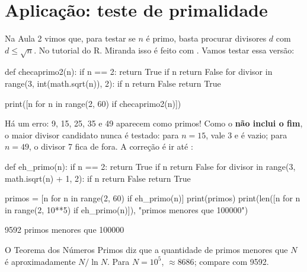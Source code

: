 \section{Aplicação: teste de primalidade}

Na Aula 2 vimos que, para testar se $n$ é primo, basta procurar divisores $d$ com $d\le\sqrt n$. No tutorial do
R. Miranda isso é feito com . Vamos testar essa versão:

\begin{entrada}
def checaprimo2(n):
    if n == 2:
        return True
    if n %
        return False
    for divisor in range(3, int(math.sqrt(n)), 2):
        if n %
            return False
    return True

print([n for n in range(2, 60) if checaprimo2(n)])
\end{entrada}
\begin{saida}
[2, 3, 5, 7, 9, 11, 13, 15, 17, 19, 23, 25, 29, 31, 35, 37, 41, 43, 47, 49, 53, 59]
\end{saida}

Há um erro: 9, 15, 25, 35 e 49 aparecem como primos! Como o  \textbf{não inclui o fim}, o maior
divisor candidato nunca é testado: para $n=15$,  vale 3 e  é vazio;
para $n=49$, o divisor 7 fica de fora. A correção é ir até :

\begin{entrada}
def eh_primo(n):
    if n == 2:
        return True
    if n %
        return False
    for divisor in range(3, math.isqrt(n) + 1, 2):
        if n %
            return False
    return True

primos = [n for n in range(2, 60) if eh_primo(n)]
print(primos)
print(len([n for n in range(2, 10**5) if eh_primo(n)]), "primos menores que 100000")
\end{entrada}
\begin{saida}
[2, 3, 5, 7, 11, 13, 17, 19, 23, 29, 31, 37, 41, 43, 47, 53, 59]
9592 primos menores que 100000
\end{saida}

\begin{observacao}
O Teorema dos Números Primos diz que a quantidade de primos menores que $N$ é aproximadamente $N/\ln N$. Para
$N=10^5$,  $\approx 8686$; compare com 9592.
\end{observacao}

